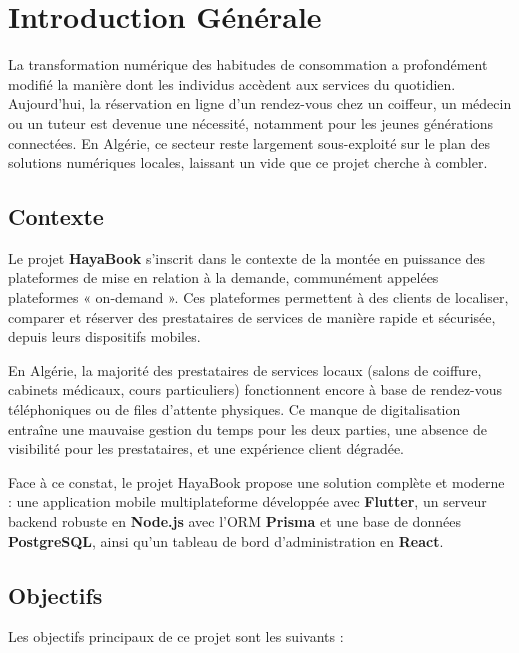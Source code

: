 \chapter{Introduction Générale}

La transformation numérique des habitudes de consommation a profondément modifié la manière dont les individus accèdent aux services du quotidien. Aujourd'hui, la réservation en ligne d'un rendez-vous chez un coiffeur, un médecin ou un tuteur est devenue une nécessité, notamment pour les jeunes générations connectées. En Algérie, ce secteur reste largement sous-exploité sur le plan des solutions numériques locales, laissant un vide que ce projet cherche à combler.

\section{Contexte}

Le projet \textbf{HayaBook} s'inscrit dans le contexte de la montée en puissance des plateformes de mise en relation à la demande, communément appelées plateformes « on-demand ». Ces plateformes permettent à des clients de localiser, comparer et réserver des prestataires de services de manière rapide et sécurisée, depuis leurs dispositifs mobiles.

En Algérie, la majorité des prestataires de services locaux (salons de coiffure, cabinets médicaux, cours particuliers) fonctionnent encore à base de rendez-vous téléphoniques ou de files d'attente physiques. Ce manque de digitalisation entraîne une mauvaise gestion du temps pour les deux parties, une absence de visibilité pour les prestataires, et une expérience client dégradée.

Face à ce constat, le projet HayaBook propose une solution complète et moderne : une application mobile multiplateforme développée avec \textbf{Flutter}, un serveur backend robuste en \textbf{Node.js} avec l'ORM \textbf{Prisma} et une base de données \textbf{PostgreSQL}, ainsi qu'un tableau de bord d'administration en \textbf{React}.

\section{Objectifs}

Les objectifs principaux de ce projet sont les suivants :

